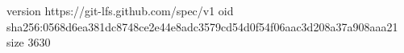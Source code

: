 version https://git-lfs.github.com/spec/v1
oid sha256:0568d6ea381dc8748ce2e44e8adc3579cd54d0f54f06aac3d208a37a908aaa21
size 3630
